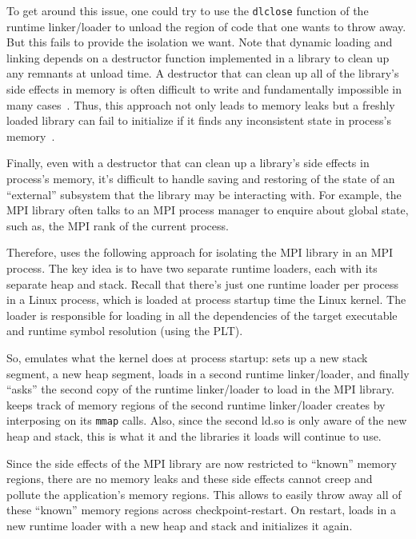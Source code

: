 \documentclass[11pt,letter]{article}
\begin{document}
To get around this issue, one could try to use the \texttt{dlclose} function
of the runtime linker/loader to unload the region of code that one wants to
throw away. But this fails to provide the isolation we want. Note that dynamic
loading and linking depends on a destructor function implemented in a library
to clean up any remnants at unload time. A destructor that can clean up
all of the library's side effects in memory is often difficult to write and
fundamentally impossible in many cases~\cite{garg2018crum}. Thus, this approach
not only leads to memory leaks but a freshly loaded library can fail to
initialize if it finds any inconsistent state in process's
memory~\cite{garg2018crum}.

Finally, even with a destructor that can clean up a library's side effects in
process's memory, it's difficult to handle saving and restoring of the
state of an ``external'' subsystem that the library may be interacting with.
For example, the MPI library often talks to an MPI process manager to
enquire about global state, such as, the MPI rank of the current process.

Therefore, \mpiSol{} uses the following approach for isolating the MPI library
in an MPI process. The key idea is to have two separate runtime loaders,
each with its separate heap and stack. Recall that there's just one runtime
loader per process in a Linux process, which is loaded at process startup time
the Linux kernel. The loader is responsible for loading in all the dependencies
of the target executable and runtime symbol resolution (using the PLT).

So, \mpiSol{} emulates what the kernel does at process startup: sets up a new
stack segment, a new heap segment, loads in a second runtime linker/loader,
and finally ``asks'' the second copy of the runtime linker/loader to load
in the MPI library. \mpiSol{} keeps track of memory regions of the second runtime
linker/loader creates by interposing on its \texttt{mmap} calls.
Also, since the second ld.so is only aware of the new heap and stack,
this is what it and the libraries it loads will continue to use.

Since the side effects of the MPI library are now restricted to ``known''
memory regions, there are no memory leaks and these side effects cannot
creep and pollute the application's memory regions. This allows \mpiSol{} to
easily throw away all of these ``known'' memory regions across
checkpoint-restart. On restart, \mpiSol{} loads in a new runtime loader
with a new heap and stack and initializes it again.
\end{document}
